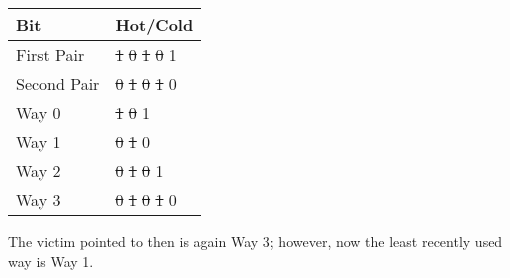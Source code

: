 \documentclass[12pt,letterpaper,twoside]{hmcpset}
\begin{document}
\begin{solution}
 \begin{tabular}{|l|l|}\hline
Bit & Hot/Cold\\\hline
First Pair & \sout{1} \sout{0} \sout{1} \sout{0} 1\\\hline
Second Pair & \sout{0} \sout{1} \sout{0} \sout{1} 0\\\hline
Way 0 & \sout{1} \sout{0} 1\\\hline
Way 1 & \sout{0} \sout{1} 0\\\hline
Way 2 & \sout{0} \sout{1} \sout{0} 1\\\hline
Way 3 & \sout{0} \sout{1} \sout{0} \sout{1} 0\\\hline
\end{tabular}


The victim pointed to then is again Way 3; however, now the least recently used way is Way 1.
\end{solution}
\end{document}
